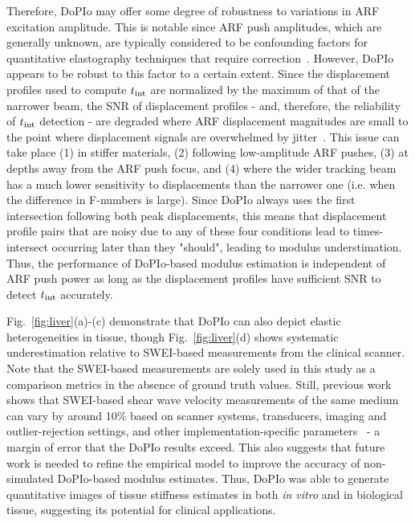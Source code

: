 Therefore, DoPIo may offer some degree of robustness to variations in ARF excitation amplitude. This is notable since ARF push amplitudes, which are generally unknown, are typically considered to be confounding factors for quantitative elastography techniques that require correction~\cite{deng_Analyzing_2015, chen_ShearWave_2023}. However, DoPIo appears to be robust to this factor to a certain extent. Since the displacement profiles used to compute $t_{\textnormal{int}}$ are normalized by the maximum of that of the narrower beam, the SNR of displacement profiles - and, therefore, the reliability of $t_{\textnormal{int}}$ detection - are degraded where ARF displacement magnitudes are small to the point where displacement signals are overwhelmed by jitter~\cite{mcaleavey_Estimates_2003,dhanaliwala_Assessing_2012}. This issue can take place (1) in stiffer materials, (2) following low-amplitude ARF pushes, (3) at depths away from the ARF push focus, and (4) where the wider tracking beam has a much lower sensitivity to displacements than the narrower one (i.e. when the difference in F-numbers is large). Since DoPIo always uses the first intersection following both peak displacements, this means that displacement profile pairs that are noisy due to any of these four conditions lead to times-intersect occurring later than they "should", leading to modulus understimation. Thus, the performance of DoPIo-based modulus estimation is independent of ARF push power as long as the displacement profiles have sufficient SNR to detect $t_{\textnormal{int}}$ accurately.

Fig.~\ref{fig:liver}(a)-(c) demonstrate that DoPIo can also depict elastic heterogeneities in tissue, though Fig.~\ref{fig:liver}(d) shows systematic underestimation relative to SWEI-based measurements from the clinical scanner. Note that the SWEI-based measurements are solely used in this study as a comparison metrics in the absence of ground truth values. Still, previous work shows that SWEI-based shear wave velocity measurements of the same medium can vary by around 10\% based on scanner systems, transducers, imaging and outlier-rejection settings, and other implementation-specific parameters~\cite{palmeri_Radiological_2021} - a margin of error that the DoPIo results exceed.  This also suggests that future work is needed to refine the empirical model to improve the accuracy of non-simulated DoPIo-based modulus estimates. Thus, DoPIo was able to generate quantitative images of tissue stiffness estimates in both \emph{in vitro} and in biological tissue, suggesting its potential for clinical applications.


